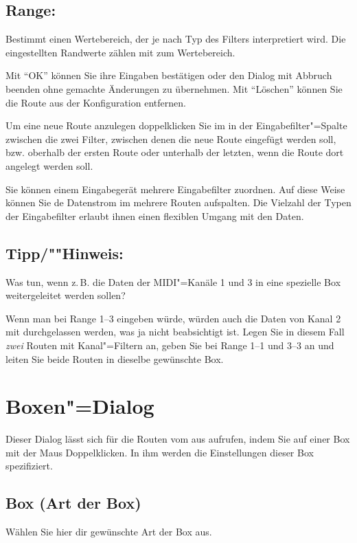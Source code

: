 \subsection{Range:}

Bestimmt einen Wertebereich, der je nach Typ des Filters interpretiert
wird. Die eingestellten Randwerte zählen mit zum Wertebereich.

Mit "`OK"' können Sie ihre Eingaben bestätigen oder den Dialog mit Abbruch
beenden ohne gemachte Änderungen zu übernehmen.  Mit "`Löschen"'
können Sie die Route aus der Konfiguration entfernen.


Um eine neue Route anzulegen doppelklicken Sie im
 in der Eingabefilter"=Spalte
zwischen die zwei Filter, zwischen denen die neue Route eingefügt
werden soll, bzw. oberhalb der ersten Route oder unterhalb der
letzten, wenn die Route dort angelegt werden soll.

Sie können einem Eingabegerät mehrere Eingabefilter zuordnen. 
Auf diese Weise können Sie de Datenstrom im mehrere Routen 
aufspalten. Die Vielzahl der Typen der Eingabefilter erlaubt 
ihnen einen flexiblen Umgang mit den Daten.

\subsection{Tipp/""Hinweis:}
Was tun, wenn z.\,B. die Daten der MIDI"=Kanäle 1 und 3 in eine 
spezielle Box weitergeleitet werden sollen?

Wenn man bei Range 1--3 eingeben würde, würden auch die 
Daten von Kanal 2 mit durchgelassen werden, was ja nicht beabsichtigt 
ist. Legen Sie in diesem Fall \emph{zwei} Routen mit Kanal"=Filtern 
an, geben Sie bei Range 1--1 und 3--3 an und leiten Sie beide 
Routen in dieselbe gewünschte Box. 

\section{Boxen"=Dialog}\label{sec:DE_R2}

Dieser Dialog lässt sich für die Routen vom  
aus aufrufen, indem Sie auf einer Box mit der Maus Doppelklicken. 
In ihm werden die Einstellungen dieser Box spezifiziert.

\subsection{Box (Art der Box)} Wählen Sie hier dir gewünschte Art der
Box aus.

